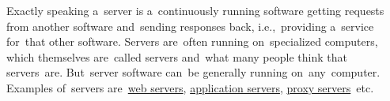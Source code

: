 \label{server}
Exactly speaking a~server is a~continuously running software getting requests from another software and~sending responses back, i.e.,~providing a~service for~that other software.
Servers are~often running on~specialized computers, which themselves are~called servers and~what many people think that servers~are.
But~server software can~be generally running on~any~computer.
Examples of~servers are~\hyperref[webserver]{web servers}, \hyperref[applicationserver]{application servers}, \hyperref[proxy]{proxy servers}~etc.
